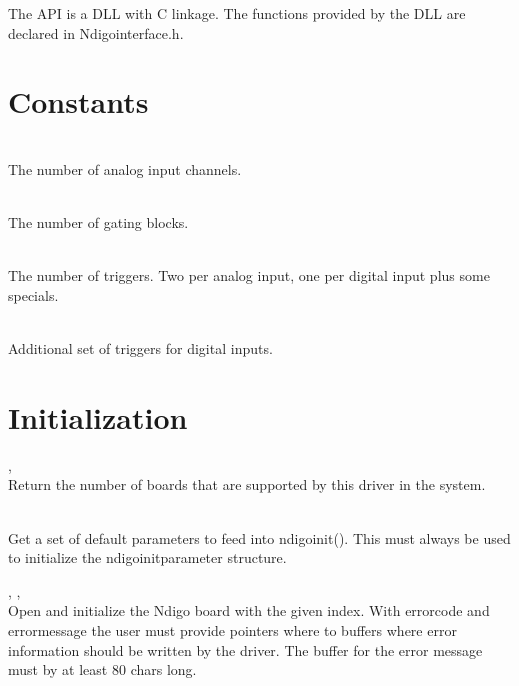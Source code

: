 The API is a DLL with C linkage. The functions provided by the DLL are declared in \textsf{Ndigo\tu interface.h}. \par

\section{Constants}

	\\
	The number of analog input channels.\par

	\\
	The number of gating blocks.\par

	\\
	The number of triggers. Two per analog input, one per digital input plus some specials.\par

	\\
	Additional set of triggers for digital inputs.

	\section{Initialization}

		, \\
		Return the number of boards that are supported by this driver in the system.\par

		\\
		Get a set of default parameters to feed into \textsf{ndigo\tu init()}. This must always be used to initialize the \textsf{ndigo\tu init\tu parameter structure}.\par

		, , \\
		Open and initialize the Ndigo board with the given index. With \textsf{error\tu code} and \textsf{error\tu message} the user must provide pointers where to buffers where error information should be written by the driver. The buffer for the error message must by at least 80 chars long.\par
		
